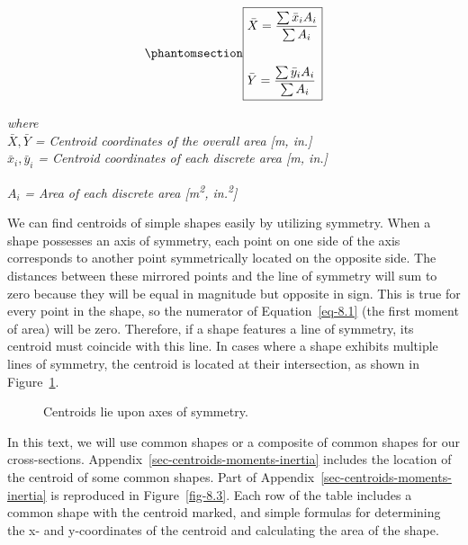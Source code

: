 \documentclass[
  letterpaper,
  DIV=11,
  numbers=noendperiod]{scrreprt}
\theoremstyle{definition}
\theoremstyle{remark}
\begin{document}
\begin{equation}\phantomsection\label{eq-8.1}{
\boxed{\begin{aligned}
&\bar{X}=\frac{\sum \bar{x}_i A_i}{\sum A_i} \\
\\
&\bar{Y}=\frac{\sum \bar{y}_i A_i}{\sum A_i}
\end{aligned}}
}\end{equation}

\emph{where}\\
\(\bar{X}, \bar{Y}\) \emph{= Centroid coordinates of the overall area
{[}m, in.{]}}\\
\(\bar{x}_i, \bar{y}_i\) \emph{= Centroid coordinates of each discrete
area {[}m, in.{]}}

\(A_i\) \emph{= Area of each discrete area {[}m\textsuperscript{2},
in.\textsuperscript{2}{]}}

We can find centroids of simple shapes easily by utilizing symmetry.
When a shape possesses an axis of symmetry, each point on one side of
the axis corresponds to another point symmetrically located on the
opposite side. The distances between these mirrored points and the line
of symmetry will sum to zero because they will be equal in magnitude but
opposite in sign. This is true for every point in the shape, so the
numerator of Equation~\ref{eq-8.1} (the first moment of area) will be
zero. Therefore, if a shape features a line of symmetry, its centroid
must coincide with this line. In cases where a shape exhibits multiple
lines of symmetry, the centroid is located at their intersection, as
shown in Figure~\ref{fig-8.2}.

\begin{figure}


\caption{\label{fig-8.2}Centroids lie upon axes of symmetry.}

\end{figure}%

In this text, we will use common shapes or a composite of common shapes
for our cross-sections. Appendix~\ref{sec-centroids-moments-inertia}
includes the location of the centroid of some common shapes. Part of
Appendix~\ref{sec-centroids-moments-inertia} is reproduced in
Figure~\ref{fig-8.3}. Each row of the table includes a common shape with
the centroid marked, and simple formulas for determining the x- and
y-coordinates of the centroid and calculating the area of the shape.
\end{document}
